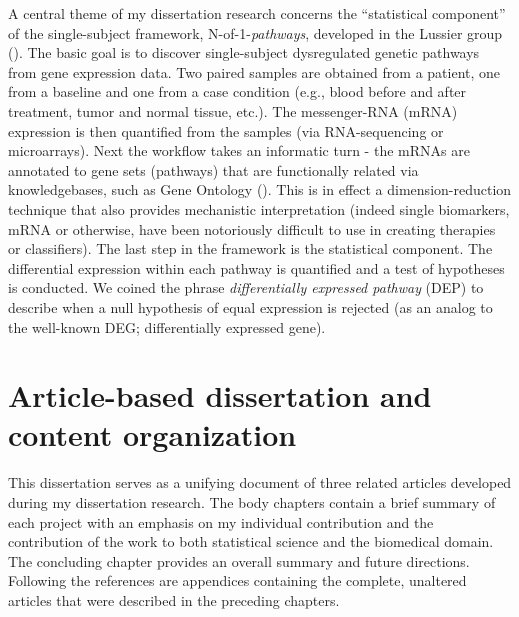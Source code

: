 \indent \indent A central theme of my dissertation research concerns the ``statistical component'' of the single-subject framework, N-of-1-\emph{pathways}, developed in the Lussier group (\cite{Gardeux2014}). The basic goal is to discover single-subject dysregulated genetic pathways from gene expression data. Two paired samples are obtained from a patient, one from a baseline and one from a case condition (e.g., blood before and after treatment, tumor and normal tissue, etc.). The messenger-RNA (mRNA) expression is then quantified from the samples (via RNA-sequencing or microarrays). Next the workflow takes an informatic turn - the mRNAs are annotated to gene sets (pathways) that are functionally related via knowledgebases, such as Gene Ontology (\cite{Ashburner2000}). This is in effect a dimension-reduction technique that also provides mechanistic interpretation (indeed single biomarkers, mRNA or otherwise, have been notoriously difficult to use in creating therapies or classifiers). The last step in the framework is the statistical component. The differential expression within each pathway is quantified and a test of hypotheses is conducted. We coined the phrase \emph{differentially expressed pathway} (DEP) to describe when a null hypothesis of equal expression is rejected (as an analog to the well-known DEG; differentially expressed gene). 

\section{Article-based dissertation and content organization}\label{sec:org}
\indent \indent This dissertation serves as a unifying document of three related articles developed during my dissertation research. The body chapters contain a brief summary of each project with an emphasis on my individual contribution and the contribution of the work to both statistical science and the biomedical domain. The concluding chapter provides an overall summary and future directions. Following the references are appendices containing the complete, unaltered articles that were described in the preceding chapters.

